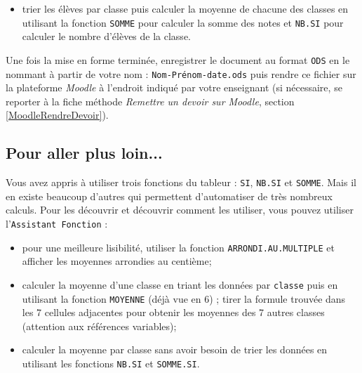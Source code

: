 {\begin{itemize}
\item trier les élèves par classe puis calculer la moyenne de chacune des classes en utilisant la fonction \texttt{SOMME} pour calculer la somme des notes et \texttt{NB.SI} pour calculer le nombre d'élèves de la classe.
\end{itemize}
Une fois la mise en forme terminée, enregistrer le document au format \texttt{ODS} en le nommant à partir de votre nom : \texttt{Nom-Prénom-date.ods} puis rendre ce fichier sur la plateforme \emph{Moodle} à l'endroit indiqué par votre enseignant (si nécessaire, se reporter à la fiche méthode \emph{Remettre un devoir sur Moodle}, section \vref{MoodleRendreDevoir}).
} %

\subsection*{Pour aller plus loin...}
Vous avez appris à utiliser trois fonctions du tableur : \texttt{SI}, \texttt{NB.SI} et \texttt{SOMME}. Mais il en existe beaucoup d'autres qui permettent d'automatiser de très nombreux calculs. Pour les découvrir et découvrir comment les utiliser, vous pouvez utiliser l'\texttt{Assistant Fonction} :

\begin{itemize}
\item pour une meilleure lisibilité, utiliser la fonction \texttt{ARRONDI.AU.MULTIPLE} et afficher les moyennes arrondies au centième;
\item calculer la moyenne d'une classe en triant les données par \texttt{classe} puis en utilisant la fonction \texttt{MOYENNE} (déjà vue en 6) ; tirer la formule trouvée dans les 7 cellules adjacentes pour obtenir les moyennes des 7 autres classes (attention aux références variables);
\item calculer la moyenne par classe sans avoir besoin de trier les données en utilisant les fonctions \texttt{NB.SI} et \texttt{SOMME.SI}.
\end{itemize}

\vfill





%
%
%
%


